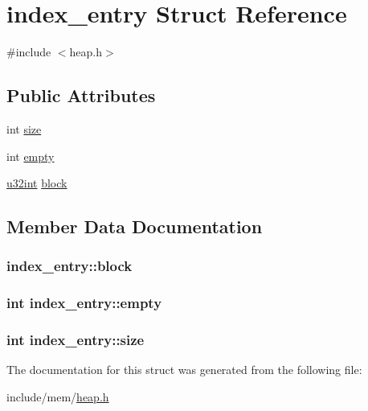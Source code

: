 \hypertarget{structindex__entry}{}\section{index\+\_\+entry Struct Reference}
\label{structindex__entry}


{\ttfamily \#include $<$heap.\+h$>$}

\subsection*{Public Attributes}
\begin{DoxyCompactItemize}
\item 
int \hyperlink{structindex__entry_a2b0247aae5c7f9884f8eef1ee121adb0}{size}
\item 
int \hyperlink{structindex__entry_afdbdffb4bd17e4ab003b94be3d5bade7}{empty}
\item 
\hyperlink{system_8h_a757de76cafbcddaac0d1632902fe4cb8}{u32int} \hyperlink{structindex__entry_a0a8d4dc0595b5f2ef42e7080c5221c1f}{block}
\end{DoxyCompactItemize}


\subsection{Member Data Documentation}
\hypertarget{structindex__entry_a0a8d4dc0595b5f2ef42e7080c5221c1f}{}
\subsubsection[{block}]{ index\+\_\+entry\+::block}\label{structindex__entry_a0a8d4dc0595b5f2ef42e7080c5221c1f}
\hypertarget{structindex__entry_afdbdffb4bd17e4ab003b94be3d5bade7}{}
\subsubsection[{empty}]{\setlength{\rightskip}{0pt plus 5cm}int index\+\_\+entry\+::empty}\label{structindex__entry_afdbdffb4bd17e4ab003b94be3d5bade7}
\hypertarget{structindex__entry_a2b0247aae5c7f9884f8eef1ee121adb0}{}
\subsubsection[{size}]{\setlength{\rightskip}{0pt plus 5cm}int index\+\_\+entry\+::size}\label{structindex__entry_a2b0247aae5c7f9884f8eef1ee121adb0}


The documentation for this struct was generated from the following file\+:\begin{DoxyCompactItemize}
\item 
include/mem/\hyperlink{heap_8h}{heap.\+h}\end{DoxyCompactItemize}

